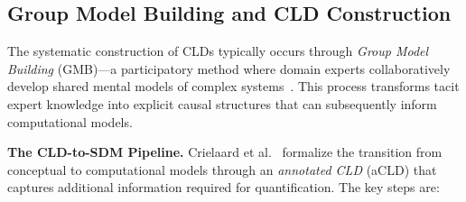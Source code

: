 \documentclass[12pt]{article}
\begin{document}
\subsection{Group Model Building and CLD Construction}

The systematic construction of CLDs typically occurs through \emph{Group Model Building} (GMB)---a participatory method where domain experts collaboratively develop shared mental models of complex systems~\cite{crielaard2024refining}. This process transforms tacit expert knowledge into explicit causal structures that can subsequently inform computational models.

\medskip
\noindent
\textbf{The CLD-to-SDM Pipeline.} Crielaard et al.~\cite{crielaard2024refining} formalize the transition from conceptual to computational models through an \emph{annotated CLD} (aCLD) that captures additional information required for quantification. The key steps are:
\end{document}
